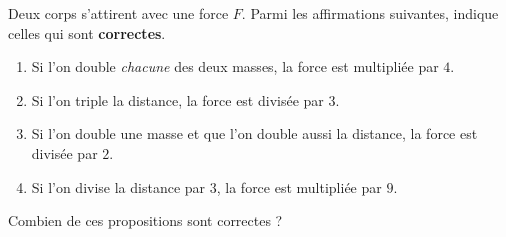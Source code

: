 \documentclass[11pt,a4paper]{article}
\begin{document}
\begin{exo}
Deux corps s'attirent avec une force $F$. Parmi les affirmations suivantes,
indique celles qui sont \textbf{correctes}.
\begin{enumerate}[label=\alph*)]
  \item Si l'on double \emph{chacune} des deux masses, la force est multipliée par $4$.
  \item Si l'on triple la distance, la force est divisée par $3$.
  \item Si l'on double une masse et que l'on double aussi la distance, la force est
        divisée par $2$.
  \item Si l'on divise la distance par $3$, la force est multipliée par $9$.
\end{enumerate}
Combien de ces propositions sont correctes ?
\end{exo}
\end{document}
